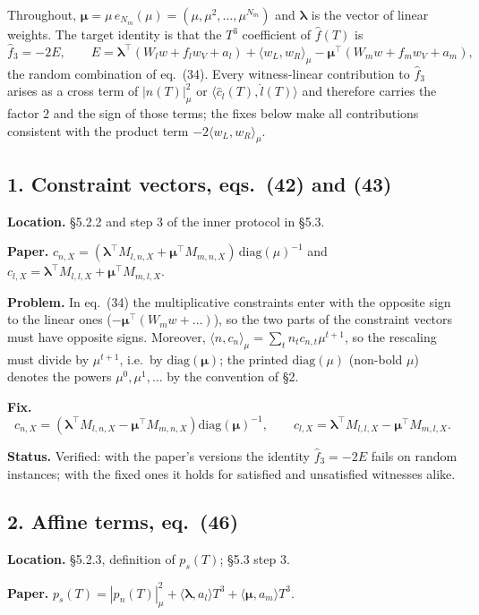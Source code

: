\documentclass[11pt,a4paper]{article}
\newcommand{\bmu}{\boldsymbol{\mu}}
\newcommand{\blam}{\boldsymbol{\lambda}}
\newcommand{\status}[1]{\par\noindent\textbf{Status.} #1}
\newcommand{\loc}[1]{\par\noindent\textbf{Location.} #1}
\begin{document}
Throughout, $\bmu = \mu\, e_{N_m}(\mu) = (\mu, \mu^2, \dots, \mu^{N_m})$ and $\blam$ is the
vector of linear weights. The target identity is that the $T^3$ coefficient of $\hat f(T)$ is
\[
  \hat f_3 = -2E, \qquad
  E = \blam^\top (W_l w + f_l w_V + a_l) + \langle w_L, w_R\rangle_\mu
      - \bmu^\top (W_m w + f_m w_V + a_m),
\]
the random combination of eq.~(34). Every witness-linear contribution to $\hat f_3$ arises as a
cross term of $|n(T)|^2_\mu$ or $\langle \hat c_l(T), \hat l(T)\rangle$ and therefore carries the
factor $2$ and the sign of those terms; the fixes below make all contributions consistent with
the product term $-2\langle w_L, w_R\rangle_\mu$.

\subsection*{1. Constraint vectors, eqs.\ (42) and (43)}
\loc{\S5.2.2 and step 3 of the inner protocol in \S5.3.}

\noindent\textbf{Paper.}
$c_{n,X} = (\blam^\top M_{l,n,X} + \bmu^\top M_{m,n,X})\,\mathrm{diag}(\mu)^{-1}$ and
$c_{l,X} = \blam^\top M_{l,l,X} + \bmu^\top M_{m,l,X}$.

\noindent\textbf{Problem.} In eq.~(34) the multiplicative constraints enter with the opposite
sign to the linear ones ($-\bmu^\top(W_m w + \dots)$), so the two parts of the constraint vectors
must have opposite signs. Moreover, $\langle n, c_{n}\rangle_\mu = \sum_t n_t c_{n,t} \mu^{t+1}$,
so the rescaling must divide by $\mu^{t+1}$, i.e.\ by $\mathrm{diag}(\bmu)$; the printed
$\mathrm{diag}(\mu)$ (non-bold $\mu$) denotes the powers $\mu^0, \mu^1, \dots$ by the
convention of \S2.

\noindent\textbf{Fix.}
\[
  c_{n,X} = \left(\blam^\top M_{l,n,X} - \bmu^\top M_{m,n,X}\right)\mathrm{diag}(\bmu)^{-1},
  \qquad
  c_{l,X} = \blam^\top M_{l,l,X} - \bmu^\top M_{m,l,X}.
\]
\status{Verified: with the paper's versions the identity $\hat f_3 = -2E$ fails on random
instances; with the fixed ones it holds for satisfied and unsatisfied witnesses alike.}

\subsection*{2. Affine terms, eq.\ (46)}
\loc{\S5.2.3, definition of $p_s(T)$; \S5.3 step 3.}

\noindent\textbf{Paper.} $p_s(T) = |p_n(T)|^2_\mu + \langle \blam, a_l\rangle T^3
+ \langle \bmu, a_m\rangle T^3$.
\end{document}
